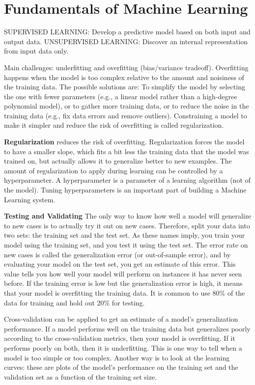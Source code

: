 \section*{Fundamentals of Machine Learning}
SUPERVISED LEARNING: Develop a predictive model based on both input and output data.
UNSUPERVISED LEARNING: Discover an internal representation from input data only.

Main challenges: underfitting and overfitting (bias/variance tradeoff).
Overfitting happens when the model is too complex relative to the amount and noisiness of the training data. The possible solutions are: To simplify the model by selecting the one with fewer parameters (e.g., a linear model rather than a high-degree polynomial model),
or to gather more training data,
or to reduce the noise in the training data (e.g., fix data errors and remove outliers).
Constraining a model to make it simpler and reduce the risk of overfitting is called regularization.

\textbf{Regularization}
reduces the risk of overfitting.
Regularization forces the model to have a smaller slope, which fits a bit less the training data that the model was trained on, but actually allows it to generalize better to new examples.
The amount of regularization to apply during learning can be controlled by a hyperparameter. 
A hyperparameter is a parameter of a learning algorithm (not of the model).
Tuning hyperparameters is an important part of building a Machine Learning system.

\textbf{Testing and Validating}
The only way to know how well a model will generalize to new cases is to actually try it out on new cases. Therefore, split your data into two sets:
the training set and the test set. As these names imply, you train your model using the training set, and you test it using the test set.
The error rate on new cases is called the generalization error (or out-of-sample error), and by evaluating your model on the test set, you get an estimate of this error.
This value tells you how well your model will perform on instances it has never seen before.
If the training error is low but the generalization error is high, it means that your model is
overfitting the training data.
It is common to use 80\% of the data for training and hold out 20\% for testing.

Cross-validation can be applied to get an estimate of a model’s generalization performance.
If a model performs well on the training data but generalizes poorly according to the cross-validation metrics, then
your model is overfitting.
If it performs poorly on both, then it is underfitting. This is one way to tell when a model is too simple or too
complex.
Another way is to look at the learning curves: these are plots of the model’s performance on the training set and the validation set as a function of the training set size.

